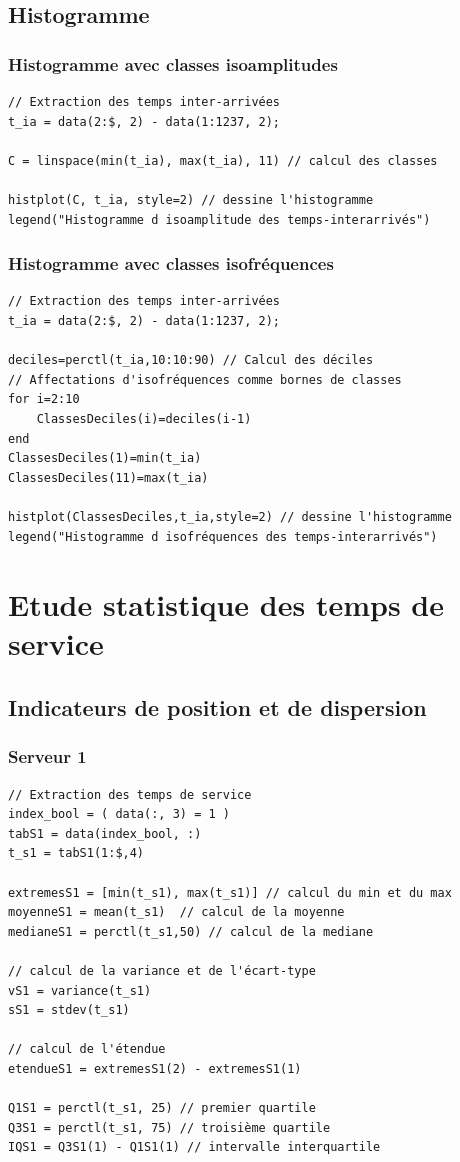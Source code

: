 \documentclass{article}
\begin{document}
\subsection{Histogramme}
\subsubsection{Histogramme avec classes isoamplitudes}
\begin{verbatim}
// Extraction des temps inter-arrivées
t_ia = data(2:$, 2) - data(1:1237, 2);

C = linspace(min(t_ia), max(t_ia), 11) // calcul des classes

histplot(C, t_ia, style=2) // dessine l'histogramme
legend("Histogramme d isoamplitude des temps-interarrivés")
\end{verbatim}
\subsubsection{Histogramme avec classes isofréquences}
\begin{verbatim}
// Extraction des temps inter-arrivées
t_ia = data(2:$, 2) - data(1:1237, 2);

deciles=perctl(t_ia,10:10:90) // Calcul des déciles
// Affectations d'isofréquences comme bornes de classes
for i=2:10
    ClassesDeciles(i)=deciles(i-1)
end
ClassesDeciles(1)=min(t_ia)
ClassesDeciles(11)=max(t_ia)

histplot(ClassesDeciles,t_ia,style=2) // dessine l'histogramme
legend("Histogramme d isofréquences des temps-interarrivés")
\end{verbatim}

\section{Etude statistique des temps de service}

\subsection{Indicateurs de position et de dispersion}

\subsubsection{Serveur 1}
\begin{verbatim}
// Extraction des temps de service
index_bool = ( data(:, 3) = 1 )
tabS1 = data(index_bool, :)
t_s1 = tabS1(1:$,4)

extremesS1 = [min(t_s1), max(t_s1)] // calcul du min et du max
moyenneS1 = mean(t_s1)  // calcul de la moyenne
medianeS1 = perctl(t_s1,50) // calcul de la mediane

// calcul de la variance et de l'écart-type
vS1 = variance(t_s1)
sS1 = stdev(t_s1)

// calcul de l'étendue
etendueS1 = extremesS1(2) - extremesS1(1)

Q1S1 = perctl(t_s1, 25) // premier quartile
Q3S1 = perctl(t_s1, 75) // troisième quartile
IQS1 = Q3S1(1) - Q1S1(1) // intervalle interquartile
\end{verbatim}
\end{document}
